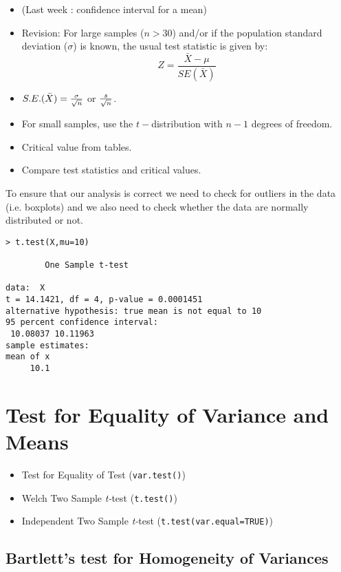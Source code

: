 \documentclass[a4paper,12pt]{article}
\begin{document}
\begin{itemize}
\begin{itemize}
\begin{itemize}
\item (Last week : confidence interval for a mean) \item Revision:
For large samples ($n > 30$) and/or if the population standard
deviation ($\sigma$) is known, the usual test statistic is given
by: \[Z =\frac{\bar{X} - \mu}{SE(\bar{X})}\]

\item $S.E.(\bar{X}) = { \sigma \over \sqrt{n}} $ or ${s \over \sqrt{n}}$. 
\item For small samples, use the $t-$distribution with $n-1$ degrees of freedom.
\item Critical value from tables.
\item Compare test statistics and critical values.
\end{itemize}

To ensure that our analysis is correct we need to check for
outliers in the data (i.e. boxplots) and we also need to check
whether the data are normally distributed or not.

\begin{framed}
\begin{verbatim}
> t.test(X,mu=10)

        One Sample t-test

data:  X 
t = 14.1421, df = 4, p-value = 0.0001451
alternative hypothesis: true mean is not equal to 10 
95 percent confidence interval:
 10.08037 10.11963 
sample estimates:
mean of x 
     10.1 
\end{verbatim}
\end{framed}




\section{Test for Equality of Variance and Means}

\begin{itemize}
\item Test for Equality of Test (\texttt{var.test()})
\item Welch Two Sample \emph{t-}test (\texttt{t.test()})
\item Independent Two Sample \emph{t-}test (\texttt{t.test(var.equal=TRUE)})

\end{itemize}

\subsection{Bartlett's test for Homogeneity of Variances}
 


\end{itemize}
\end{itemize}
\end{document}
